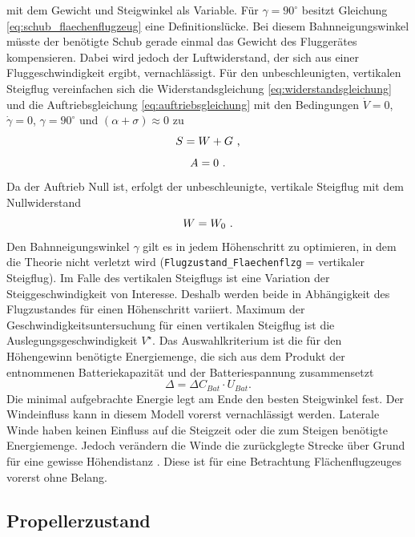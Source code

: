 mit dem Gewicht und Steigwinkel als Variable.
Für \ensuremath{\gamma = 90^\circ} besitzt Gleichung \eqref{eq:schub_flaechenflugzeug} eine Definitionslücke. Bei diesem Bahnneigungswinkel müsste der benötigte Schub gerade einmal das Gewicht des Fluggerätes kompensieren. Dabei wird jedoch der Luftwiderstand, der sich aus einer Fluggeschwindigkeit ergibt, vernachlässigt. 
Für den unbeschleunigten, vertikalen Steigflug vereinfachen sich die Widerstandsgleichung \eqref{eq:widerstandsgleichung} und die Auftriebsgleichung \eqref{eq:auftriebsgleichung} mit den Bedingungen \ensuremath{\dot{V} = 0}, \ensuremath{\dot{\gamma} = 0}, \ensuremath{\gamma = 90^\circ} und \ensuremath{(\alpha + \sigma) \approx 0} zu 
\begin{equation}
	S = W + G ~\text{,} 
\end{equation}
\begin{equation}
	A = 0 ~\text{.}
\end{equation}
Da der Auftrieb Null ist, erfolgt der unbeschleunigte, vertikale Steigflug mit dem Nullwiderstand
\begin{equation}
	W = W_0 ~\text{.}
	\label{eq:widerstand_vertikalflug}
\end{equation}
Den Bahnneigungswinkel \ensuremath{\gamma} gilt es in jedem Höhenschritt zu optimieren, in dem die Theorie nicht verletzt wird (\texttt{Flugzustand\_Flaechenflzg} = vertikaler Steigflug). Im Falle des vertikalen Steigflugs ist eine Variation der Steiggeschwindigkeit von Interesse. Deshalb werden beide in Abhängigkeit des Flugzustandes für einen Höhenschritt variiert. Maximum der Geschwindigkeitsuntersuchung für einen vertikalen Steigflug ist die Auslegungsgeschwindigkeit \ensuremath{V^\star}. Das Auswahlkriterium ist die für den Höhengewinn benötigte Energiemenge, die sich aus dem Produkt der entnommenen Batteriekapazität und der Batteriespannung zusammensetzt
\begin{equation}
	\Delta = \Delta C_{Bat}\cdot U_{Bat}.
\end{equation}
Die minimal aufgebrachte Energie legt am Ende den besten Steigwinkel fest.
Der Windeinfluss kann in diesem Modell vorerst vernachlässigt werden. Laterale Winde haben keinen Einfluss auf die Steigzeit oder die zum Steigen benötigte Energiemenge. Jedoch verändern die Winde die zurückglegte Strecke über Grund für eine gewisse Höhendistanz \cite[S.241-242]{Scheiderer.2008}. Diese ist für eine Betrachtung Flächenflugzeuges vorerst ohne Belang. 


\subsection{Propellerzustand}
\label{subsec:propellerzustand}

